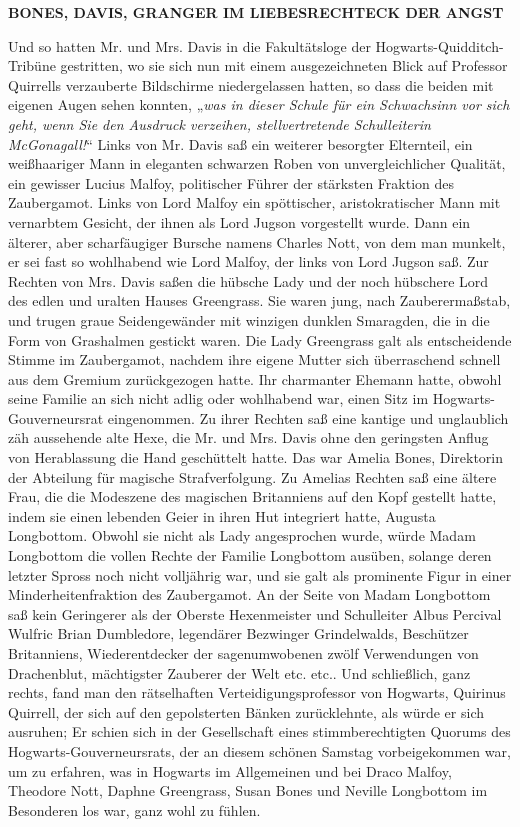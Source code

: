 {\textbf{BONES, DAVIS, GRANGER IM LIEBESRECHTECK DER ANGST}

Und so hatten Mr. und Mrs. Davis in die Fakultätsloge der Hogwarts-Quidditch-Tribüne gestritten, wo sie sich nun mit einem ausgezeichneten Blick auf Professor Quirrells verzauberte Bildschirme niedergelassen hatten, so dass die beiden mit eigenen Augen sehen konnten, „\emph{was in dieser Schule für ein Schwachsinn vor sich geht, wenn Sie den Ausdruck verzeihen, stellvertretende Schulleiterin McGonagall!}“ Links von Mr. Davis saß ein weiterer besorgter Elternteil, ein weißhaariger Mann in eleganten schwarzen Roben von unvergleichlicher Qualität, ein gewisser Lucius Malfoy, politischer Führer der stärksten Fraktion des Zaubergamot. Links von Lord Malfoy ein spöttischer, aristokratischer Mann mit vernarbtem Gesicht, der ihnen als Lord Jugson vorgestellt wurde. Dann ein älterer, aber scharfäugiger Bursche namens Charles Nott, von dem man munkelt, er sei fast so wohlhabend wie Lord Malfoy, der links von Lord Jugson saß. Zur Rechten von Mrs. Davis saßen die hübsche Lady und der noch hübschere Lord des edlen und uralten Hauses Greengrass. Sie waren jung, nach Zauberermaßstab, und trugen graue Seidengewänder mit winzigen dunklen Smaragden, die in die Form von Grashalmen gestickt waren. Die Lady Greengrass galt als entscheidende Stimme im Zaubergamot, nachdem ihre eigene Mutter sich überraschend schnell aus dem Gremium zurückgezogen hatte. Ihr charmanter Ehemann hatte, obwohl seine Familie an sich nicht adlig oder wohlhabend war, einen Sitz im Hogwarts-Gouverneursrat eingenommen. Zu ihrer Rechten saß eine kantige und unglaublich zäh aussehende alte Hexe, die Mr. und Mrs. Davis ohne den geringsten Anflug von Herablassung die Hand geschüttelt hatte. Das war Amelia Bones, Direktorin der Abteilung für magische Strafverfolgung. Zu Amelias Rechten saß eine ältere Frau, die die Modeszene des magischen Britanniens auf den Kopf gestellt hatte, indem sie einen lebenden Geier in ihren Hut integriert hatte, Augusta Longbottom. Obwohl sie nicht als Lady angesprochen wurde, würde Madam Longbottom die vollen Rechte der Familie Longbottom ausüben, solange deren letzter Spross noch nicht volljährig war, und sie galt als prominente Figur in einer Minderheitenfraktion des Zaubergamot. An der Seite von Madam Longbottom saß kein Geringerer als der Oberste Hexenmeister und Schulleiter Albus Percival Wulfric Brian Dumbledore, legendärer Bezwinger Grindelwalds, Beschützer Britanniens, Wiederentdecker der sagenumwobenen zwölf Verwendungen von Drachenblut, mächtigster Zauberer der Welt etc. etc.. Und schließlich, ganz rechts, fand man den rätselhaften Verteidigungsprofessor von Hogwarts, Quirinus Quirrell, der sich auf den gepolsterten Bänken zurücklehnte, als würde er sich ausruhen; Er schien sich in der Gesellschaft eines stimmberechtigten Quorums des Hogwarts-Gouverneursrats, der an diesem schönen Samstag vorbeigekommen war, um zu erfahren, was in Hogwarts im Allgemeinen und bei Draco Malfoy, Theodore Nott, Daphne Greengrass, Susan Bones und Neville Longbottom im Besonderen los war, ganz wohl zu fühlen.

}
